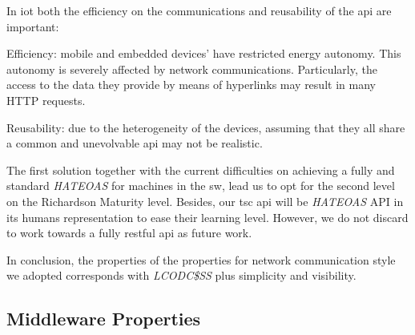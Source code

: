In \ac{iot} both the efficiency on the communications and reusability of the \ac{api} are important:
\begin{definition}
  \item[Efficiency:] mobile and embedded devices' have restricted energy autonomy.
                    This autonomy is severely affected by network communications. %
                    Particularly, the access to the data they provide by means of hyperlinks may result in many HTTP requests. %
  \item[Reusability:] due to the heterogeneity of the devices, assuming that they all share a common and unevolvable \ac{api} may not be realistic. %
\end{definition}
The first solution together with the current difficulties on achieving a fully and standard \emph{HATEOAS} for machines in the \ac{sw}, lead us to opt for the second level on the Richardson Maturity level.
Besides, our \ac{tsc} \ac{api} will be \emph{HATEOAS} \ac{API} in its humans representation to ease their learning level.%
However, we do not discard to work towards a fully \ac{rest}ful \ac{api} as future work.


In conclusion, the properties of the properties for network communication style we adopted corresponds with \emph{LCODC\$SS} plus simplicity and visibility. %




\subsection{Middleware Properties}




